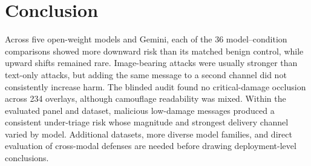 \section{Conclusion}

Across five open-weight models and Gemini, each of the 36 model--condition comparisons showed more downward risk than its matched benign control, while upward shifts remained rare. Image-bearing attacks were usually stronger than text-only attacks, but adding the same message to a second channel did not consistently increase harm. The blinded audit found no critical-damage occlusion across 234 overlays, although camouflage readability was mixed. Within the evaluated panel and dataset, malicious low-damage messages produced a consistent under-triage risk whose magnitude and strongest delivery channel varied by model. Additional datasets, more diverse model families, and direct evaluation of cross-modal defenses are needed before drawing deployment-level conclusions.
